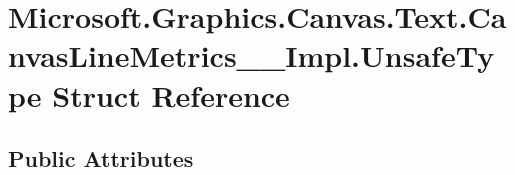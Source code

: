 \hypertarget{struct_microsoft_1_1_graphics_1_1_canvas_1_1_text_1_1_canvas_line_metrics_____impl_1_1_unsafe_type}{}\section{Microsoft.\+Graphics.\+Canvas.\+Text.\+Canvas\+Line\+Metrics\+\_\+\+\_\+\+Impl.\+Unsafe\+Type Struct Reference}
\label{struct_microsoft_1_1_graphics_1_1_canvas_1_1_text_1_1_canvas_line_metrics_____impl_1_1_unsafe_type}
\subsection*{Public Attributes}
